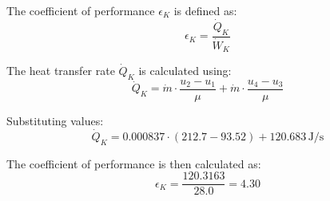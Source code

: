 The coefficient of performance \( \epsilon_K \) is defined as:  
\[
\epsilon_K = \frac{\dot{Q}_K}{\dot{W}_K}
\]

The heat transfer rate \( \dot{Q}_K \) is calculated using:  
\[
\dot{Q}_K = \dot{m} \cdot \frac{u_2 - u_1}{\mu} + \dot{m} \cdot \frac{u_4 - u_3}{\mu}
\]

Substituting values:  
\[
\dot{Q}_K = 0.000837 \cdot \left( 212.7 - 93.52 \right) + 120.683 \, \text{J/s}
\]

The coefficient of performance is then calculated as:  
\[
\epsilon_K = \frac{120.3163}{28.0} = 4.30
\]
